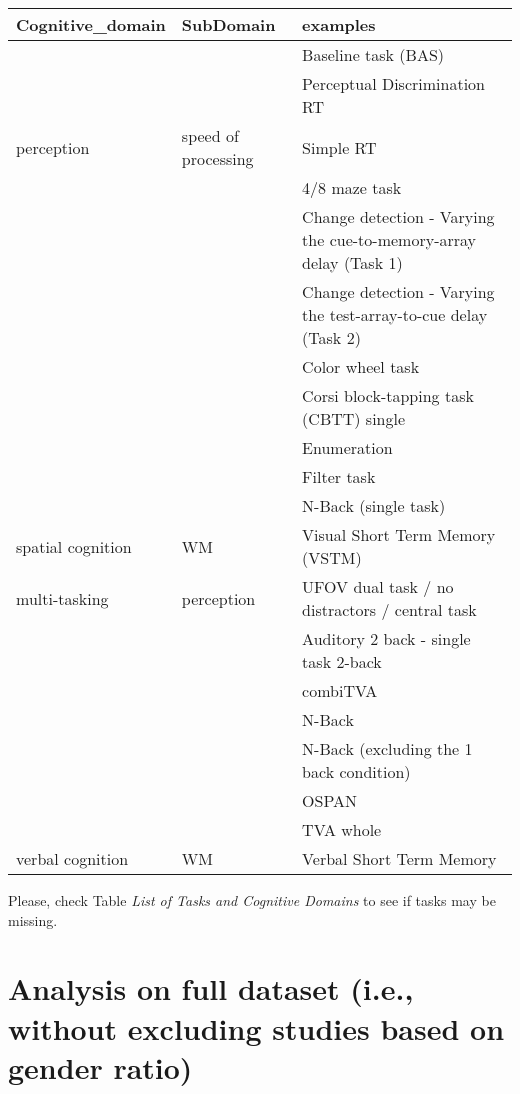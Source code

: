 \documentclass[
]{book}
\begin{document}
\begin{tabular}{l|l|l}
\hline
Cognitive\_domain & SubDomain & examples\\
\hline
 &  & Baseline task (BAS)\\
\cline{3-3}
 &  & Perceptual Discrimination RT\\
\cline{3-3}
\multirow[t]{-3}{*}{\raggedright\arraybackslash perception} & \multirow[t]{-3}{*}{\raggedright\arraybackslash speed of processing} & Simple RT\\
\cline{1-3}
 &  & 4/8 maze task\\
\cline{3-3}
 &  & Change detection - Varying the cue-to-memory-array delay (Task 1)\\
\cline{3-3}
 &  & Change detection - Varying the test-array-to-cue delay (Task 2)\\
\cline{3-3}
 &  & Color wheel task\\
\cline{3-3}
 &  & Corsi block-tapping task (CBTT) single\\
\cline{3-3}
 &  & Enumeration\\
\cline{3-3}
 &  & Filter task\\
\cline{3-3}
 &  & N-Back (single task)\\
\cline{3-3}
\multirow[t]{-9}{*}{\raggedright\arraybackslash spatial cognition} & \multirow[t]{-9}{*}{\raggedright\arraybackslash WM} & Visual Short Term Memory (VSTM)\\
\cline{1-3}
multi-tasking & perception & UFOV dual task  / no distractors / central task\\
\cline{1-3}
 &  & Auditory 2 back - single task 2-back\\
\cline{3-3}
 &  & combiTVA\\
\cline{3-3}
 &  & N-Back\\
\cline{3-3}
 &  & N-Back (excluding the 1 back condition)\\
\cline{3-3}
 &  & OSPAN\\
\cline{3-3}
 &  & TVA whole\\
\cline{3-3}
\multirow[t]{-7}{*}{\raggedright\arraybackslash verbal cognition} & \multirow[t]{-7}{*}{\raggedright\arraybackslash WM} & Verbal Short Term Memory\\
\hline
\end{tabular}

Please, check Table \emph{List of Tasks and Cognitive Domains} to see if tasks may be missing.

\hypertarget{analysis-on-full-dataset-i.e.-without-excluding-studies-based-on-gender-ratio}{%
\section{Analysis on full dataset (i.e., without excluding studies based on gender ratio)}\label{analysis-on-full-dataset-i.e.-without-excluding-studies-based-on-gender-ratio}}
\end{document}
